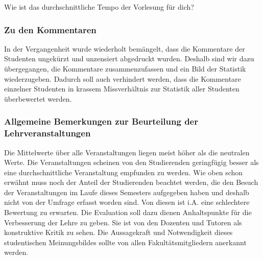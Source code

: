    \parbox[t]{8.3cm}{\raggedright Wie ist das durchschnittliche Tempo der Vorlesung für dich?}
   \hspace{0.3cm}\rule[-1cm]{0mm}{1cm}

\subsubsection{Zu den Kommentaren}
In der Vergangenheit wurde wiederholt bemängelt, dass die Kommentare
der Studenten ungekürzt und unzensiert abgedruckt wurden. Deshalb
sind wir dazu übergegangen, die Kommentare zusammenzufassen und ein Bild der Statistik wiederzugeben. Dadurch soll auch verhindert werden, dass die Kommentare einzelner Studenten in krassem
Missverhältnis zur Statistik aller Studenten überbewertet werden.

\subsubsection{Allgemeine Bemerkungen zur Beurteilung der Lehrveranstaltungen}
Die Mittelwerte über alle Veranstaltungen liegen meist höher als
die neutralen Werte. Die Veranstaltungen scheinen von den Studierenden
geringfügig besser als eine durchschnittliche Veranstaltung empfunden zu werden.
Wie oben schon erwähnt muss noch der Anteil der Studierenden
beachtet werden, die den 
Besuch der Veranstaltungen im Laufe dieses Semesters aufgegeben haben und 
deshalb nicht von der Umfrage erfasst worden sind. Von 
diesen ist i.A. eine schlechtere Bewertung zu erwarten. 
Die Evaluation soll dazu dienen Anhaltspunkte für die Verbesserung der Lehre zu geben. Sie ist von den Dozenten und Tutoren als konstruktive Kritik zu sehen. Die Aussagekraft und Notwendigkeit dieses studentischen Meinungsbildes sollte von allen Fakultätsmitgliedern anerkannt werden.

